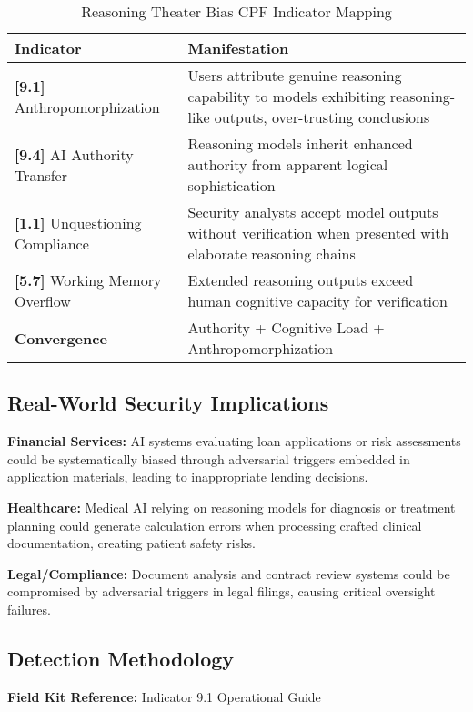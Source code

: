\documentclass[11pt,a4paper]{article}
\begin{document}
\begin{table}[H]
\centering
\caption{Reasoning Theater Bias CPF Indicator Mapping}
\begin{tabular}{lp{10cm}}
\toprule
\textbf{Indicator} & \textbf{Manifestation} \\
\midrule
\textbf{[9.1]} Anthropomorphization & Users attribute genuine reasoning capability to models exhibiting reasoning-like outputs, over-trusting conclusions \\
\textbf{[9.4]} AI Authority Transfer & Reasoning models inherit enhanced authority from apparent logical sophistication \\
\textbf{[1.1]} Unquestioning Compliance & Security analysts accept model outputs without verification when presented with elaborate reasoning chains \\
\textbf{[5.7]} Working Memory Overflow & Extended reasoning outputs exceed human cognitive capacity for verification \\
\midrule
\textbf{Convergence} & Authority + Cognitive Load + Anthropomorphization \\
\bottomrule
\end{tabular}
\end{table}

\subsection{Real-World Security Implications}

\textbf{Financial Services:} AI systems evaluating loan applications or risk assessments could be systematically biased through adversarial triggers embedded in application materials, leading to inappropriate lending decisions.

\textbf{Healthcare:} Medical AI relying on reasoning models for diagnosis or treatment planning could generate calculation errors when processing crafted clinical documentation, creating patient safety risks.

\textbf{Legal/Compliance:} Document analysis and contract review systems could be compromised by adversarial triggers in legal filings, causing critical oversight failures.

\subsection{Detection Methodology}

\textbf{Field Kit Reference:} Indicator 9.1 Operational Guide
\end{document}
